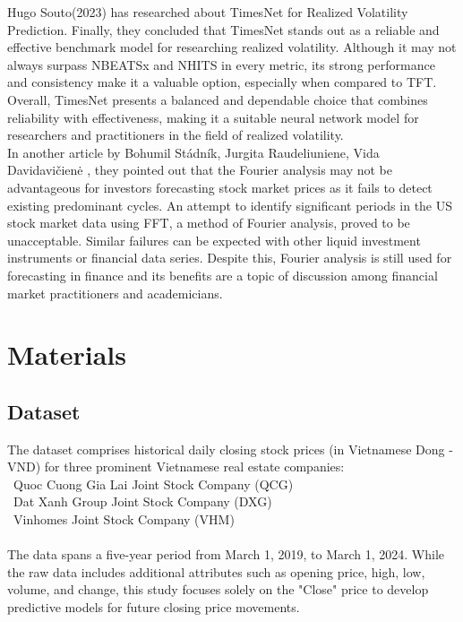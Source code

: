 \documentclass{ieeeojies}
\begin{document}
Hugo Souto(2023) \cite{b2} has researched about TimesNet for Realized Volatility Prediction. Finally, they concluded that TimesNet stands out as a reliable and effective benchmark model for researching realized volatility. Although it may not always surpass NBEATSx and NHITS in every metric, its strong performance and consistency make it a valuable option, especially when compared to TFT. Overall, TimesNet presents a balanced and dependable choice that combines reliability with effectiveness, making it a suitable neural network model for researchers and practitioners in the field of realized volatility. \\

In another article by Bohumil Stádník, Jurgita Raudeliuniene, Vida Davidavičienė \cite{b3}, they pointed out that the Fourier analysis may not be advantageous for investors forecasting stock market prices as it fails to detect existing predominant cycles. An attempt to identify significant periods in the US stock market data using FFT, a method of Fourier analysis, proved to be unacceptable. Similar failures can be expected with other liquid investment instruments or financial data series. Despite this, Fourier analysis is still used for forecasting in finance and its benefits are a topic of discussion among financial market practitioners and academicians.


\section{Materials}
\subsection{Dataset}

The dataset comprises historical daily closing stock prices (in Vietnamese Dong - VND) for three prominent Vietnamese real estate companies:
 \\
  \indent\textbullet\ Quoc Cuong Gia Lai Joint Stock Company (QCG) \\
  \indent\textbullet\ Dat Xanh Group Joint Stock Company (DXG) \\
  \indent\textbullet\ Vinhomes Joint Stock Company (VHM) \\
  \\
The data spans a five-year period from March 1, 2019, to March 1, 2024.  While the raw data includes additional attributes such as opening price, high, low, volume, and change, this study focuses solely on the "Close" price to develop predictive models for future closing price movements.
\end{document}
